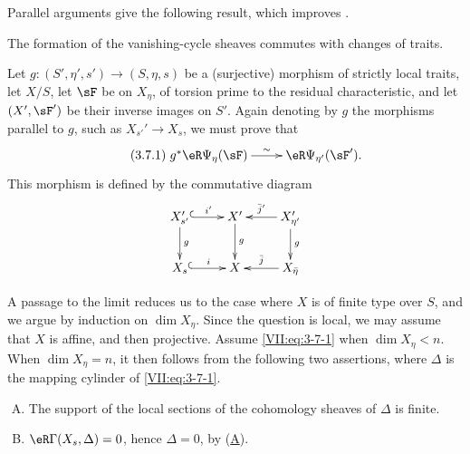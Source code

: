 Parallel arguments give the following result, which improves
\cite[XIII 2.1.12, 2.4.2]{sga7}.






\begin{proposition_}\label{VII:3-7}
The formation of the vanishing-cycle sheaves commutes with changes of traits.
\end{proposition_}

Let $g:(S',\eta',s') \to (S,\eta,s)$ be a (surjective) morphism of strictly
local traits, let $X/S$, let $\sF$ be on $X_\eta$, of torsion prime to the
residual characteristic, and let $(X',\sF')$ be their inverse images on $S'$.
Again denoting by $g$ the morphisms parallel to $g$, such as
$X_{s'}' \to X_s$, we must prove that
\begin{equation*}\tag{3.7.1}\label{VII:eq:3-7-1}
\xymatrix{
  g^\ast \eR\Psi_\eta(\sF) \ar[r]^-\sim 
    & \eR\Psi_{\eta'}(\sF') \text{.} 
}
\end{equation*}
This morphism is defined by the commutative diagram
\[\xymatrix{
  X_{s'}' \ar@{^{(}->}[r]^-{i'} \ar[d]^-g 
    & X' \ar[d]^-g 
    & X_{\eta'}' \ar[l]_-{\bar j'} \ar[d]^-g \\
  X_s \ar@{^{(}->}[r]^-i 
    & X 
    & \ar[l]_-{\bar j} X_{\bar\eta} 
}\]

A passage to the limit reduces us to the case where $X$ is of finite type
over $S$, and we argue by induction on $\dim{X_\eta}$. Since the question is
local, we may assume that $X$ is affine, and then projective. Assume
\eqref{VII:eq:3-7-1} when $\dim{X_\eta}<n$. When $\dim{X_\eta}=n$, it then
follows from the following two assertions, where $\Delta$ is the mapping
cylinder of \eqref{VII:eq:3-7-1}.

\begin{enumerate}[(A)]
  \item The support of the local sections of the cohomology sheaves of
    $\Delta$ is finite.
    \hypertarget{VII:3-A}{}
  \item $\eR\Gamma(X_s,\Delta)=0$, hence $\Delta=0$, by
    (\hyperlink{VII:3-A}{A}).
    \hypertarget{VII:3-B}{}
\end{enumerate}





\subsection{}\label{VII:3-8}

